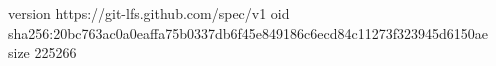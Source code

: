 version https://git-lfs.github.com/spec/v1
oid sha256:20bc763ac0a0eaffa75b0337db6f45e849186c6ecd84c11273f323945d6150ae
size 225266
